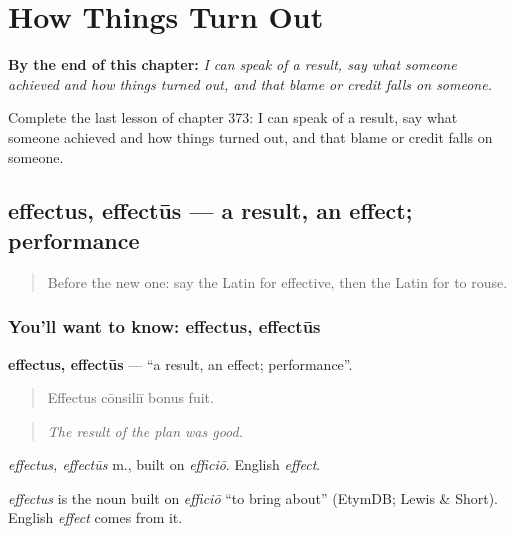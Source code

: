 
\chapter{How Things Turn Out}
\label{ch:la-how-things-turn-out}

\begin{chapteropening}
\textbf{By the end of this chapter:} \emph{I can speak of a result, say what someone achieved and how things turned out, and that blame or credit falls on someone.}

Complete the last lesson of chapter 373: I can speak of a result, say what someone achieved and how things turned out, and that blame or credit falls on someone.
\end{chapteropening}

\section[effectus, effectūs]{effectus, effectūs — a result, an effect; performance}

\label{lesson:LA-C373-effectus}



\begin{quote}
Before the new one: say the Latin for effective, then the Latin for to rouse.
\end{quote}

\subsection*{You'll want to know: effectus, effectūs}
\textbf{effectus, effectūs} — \textquotedblleft{}a result, an effect; performance\textquotedblright{}.

\begin{quote}
Effectus cōnsiliī bonus fuit.
\end{quote}

\begin{quote}
\emph{The result of the plan was good.}
\end{quote}

\emph{effectus, effectūs} m., built on \emph{efficiō}. English \emph{effect}.

\begin{cousinweb}
\emph{effectus} is the noun built on \emph{efficiō} \textquotedblleft{}to bring about\textquotedblright{} (EtymDB; Lewis \& Short). English \emph{effect} comes from it.
\end{cousinweb}

